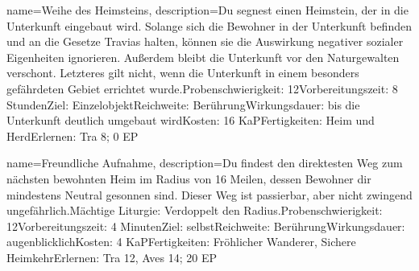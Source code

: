 {
    name={Weihe des Heimsteins},
    description={Du segnest einen Heimstein, der in die Unterkunft eingebaut wird. Solange sich die Bewohner in der Unterkunft befinden und an die Gesetze Travias halten, können sie die Auswirkung negativer sozialer Eigenheiten ignorieren. Außerdem bleibt die Unterkunft vor den Naturgewalten verschont. Letzteres gilt nicht, wenn die Unterkunft in einem besonders gefährdeten Gebiet errichtet wurde.\newline Probenschwierigkeit: 12\newline Vorbereitungszeit: 8 Stunden\newline Ziel: Einzelobjekt\newline Reichweite: Berührung\newline Wirkungsdauer: bis die Unterkunft deutlich umgebaut wird\newline Kosten: 16 KaP\newline Fertigkeiten: Heim und Herd\newline Erlernen: Tra 8; 0 EP}
}


{
    name={Freundliche Aufnahme},
    description={Du findest den direktesten Weg zum nächsten bewohnten Heim im Radius von 16 Meilen, dessen Bewohner dir mindestens Neutral gesonnen sind. Dieser Weg ist passierbar, aber nicht zwingend ungefährlich.\newline Mächtige Liturgie: Verdoppelt den Radius.\newline Probenschwierigkeit: 12\newline Vorbereitungszeit: 4 Minuten\newline Ziel: selbst\newline Reichweite: Berührung\newline Wirkungsdauer: augenblicklich\newline Kosten: 4 KaP\newline Fertigkeiten: Fröhlicher Wanderer, Sichere Heimkehr\newline Erlernen: Tra 12, Aves 14; 20 EP}
}


